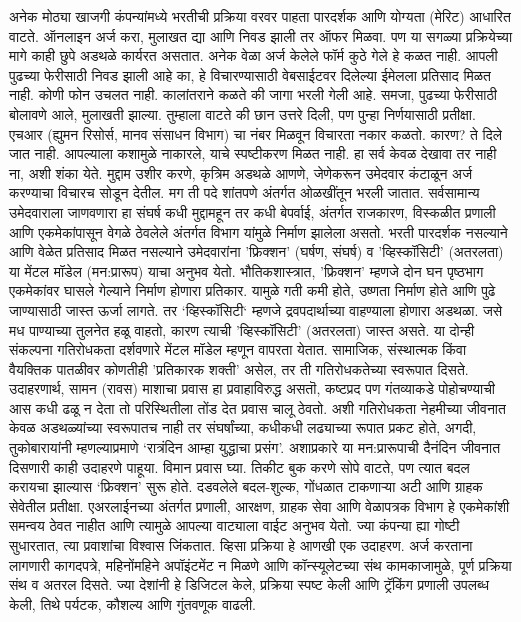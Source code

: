 अनेक मोठ्या खाजगी कंपन्यांमध्ये भरतीची प्रक्रिया वरवर पाहता पारदर्शक आणि योग्यता (मेरिट) आधारित वाटते. ऑनलाइन अर्ज करा, मुलाखत द्या आणि निवड झाली तर ऑफर मिळवा. पण या सगळ्या प्रक्रियेच्या मागे काही छुपे अडथळे कार्यरत असतात. अनेक वेळा अर्ज केलेले फॉर्म कुठे गेले हे कळत नाही. आपली पुढच्या फेरीसाठी निवड झाली आहे का, हे विचारण्यासाठी वेबसाईटवर दिलेल्या ईमेलला प्रतिसाद मिळत नाही. कोणी फोन उचलत नाही. कालांतराने कळते की जागा भरली गेली आहे. समजा, पुढच्या फेरीसाठी बोलावणे आले, मुलाखती झाल्या. तुम्हाला वाटते की छान उत्तरे दिली, पण पुन्हा निर्णयासाठी प्रतीक्षा. एचआर (ह्युमन रिसोर्स, मानव संसाधन विभाग) चा नंबर मिळवून विचारता नकार कळतो. कारण? ते दिले जात नाही. आपल्याला कशामुळे नाकारले, याचे स्पष्टीकरण मिळत नाही. हा सर्व केवळ देखावा तर नाही ना, अशी शंका येते. मुद्दाम उशीर करणे, कृत्रिम अडथळे आणणे, जेणेकरून उमेदवार कंटाळून अर्ज करण्याचा विचारच सोडून देतील. मग ती पदे शांतपणे अंतर्गत ओळखींतून भरली जातात. सर्वसामान्य उमेदवाराला जाणवणारा हा संघर्ष कधी मुद्दामहून तर कधी बेपर्वाई, अंतर्गत राजकारण, विस्कळीत प्रणाली आणि एकमेकांपासून वेगळे ठेवलेले अंतर्गत विभाग यांमुळे निर्माण झालेला असतो. भरती पारदर्शक नसल्याने आणि वेळेत प्रतिसाद मिळत नसल्याने उमेदवारांना 'फ्रिक्शन' (घर्षण, संघर्ष) व 'व्हिस्कॉसिटी' (अतरलता) या मेंटल मॉडेल (मन:प्रारूप) याचा अनुभव येतो. 
भौतिकशास्त्रात, 'फ्रिक्शन' म्हणजे दोन घन पृष्ठभाग एकमेकांवर घासले गेल्याने निर्माण होणारा प्रतिकार. यामुळे गती कमी होते, उष्णता निर्माण होते आणि पुढे जाण्यासाठी जास्त ऊर्जा लागते. तर ‘व्हिस्कॉसिटी‘ म्हणजे द्रवपदार्थाच्या वाहण्याला होणारा अडथळा. जसे मध पाण्याच्या तुलनेत हळू वाहतो, कारण त्याची 'व्हिस्कॉसिटी' (अतरलता) जास्त असते. या दोन्ही संकल्पना गतिरोधकता दर्शवणारे मेंटल मॉडेल म्हणून वापरता येतात. सामाजिक, संस्थात्मक किंवा वैयक्तिक पातळीवर कोणतीही 'प्रतिकारक शक्ती' असेल, तर ती गतिरोधकतेच्या स्वरूपात दिसते. उदाहरणार्थ, सामन (रावस) माशाचा प्रवास हा प्रवाहाविरुद्ध असतॊ, कष्टप्रद पण गंतव्याकडे पोहोचण्याची आस कधी ढळू न देता तो परिस्थितीला तोंड देत प्रवास चालू ठेवतो. अशी गतिरोधकता नेहमीच्या जीवनात केवळ अडथळ्यांच्या स्वरूपातच नाही तर संघर्षांच्या, कधीकधी लढ्याच्या रूपात प्रकट होते, अगदी, तुकोबारायांनी म्हणल्याप्रमाणे ‘रात्रंदिन आम्हा युद्धाचा प्रसंग’. अशाप्रकारे या मन:प्रारूपाची दैनंदिन जीवनात दिसणारी काही उदाहरणे पाहूया. 
विमान प्रवास घ्या. तिकीट बुक करणे सोपे वाटते, पण त्यात बदल करायचा झाल्यास ‘फ्रिक्शन’ सुरू होते. दडवलेले बदल-शुल्क, गोंधळात टाकणाऱ्या अटी आणि ग्राहक सेवेतील प्रतीक्षा. एअरलाईनच्या अंतर्गत प्रणाली, आरक्षण, ग्राहक सेवा आणि वेळापत्रक विभाग हे एकमेकांशी समन्वय ठेवत नाहीत आणि त्यामुळे आपल्या वाट्याला वाईट अनुभव येतो. ज्या कंपन्या ह्या गोष्टी सुधारतात, त्या प्रवाशांचा विश्वास जिंकतात.
व्हिसा प्रक्रिया हे आणखी एक उदाहरण. अर्ज करताना लागणारी कागदपत्रे, महिनोंमहिने अपॉइंटमेंट न मिळणे आणि कॉन्स्यूलेटच्या संथ कामकाजामुळे, पूर्ण प्रक्रिया संथ व अतरल दिसते. ज्या देशांनी हे डिजिटल केले, प्रक्रिया स्पष्ट केली आणि ट्रॅकिंग प्रणाली उपलब्ध केली, तिथे पर्यटक, कौशल्य आणि गुंतवणूक वाढली.
